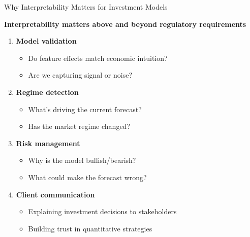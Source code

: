 \documentclass[10pt]{beamer}
\newcommand{\highlight}[1]{\textcolor{AccentOrange}{\textbf{#1}}}
\begin{document}
\begin{frame}{Why Interpretability Matters for Investment Models}

  \highlight{Interpretability matters above and beyond regulatory requirements}

  \vspace{0.5em}
  \begin{enumerate}
    \item \textbf{Model validation}
    \begin{itemize}
      \item Do feature effects match economic intuition?
      \item Are we capturing signal or noise?
    \end{itemize}

    \vspace{0.3em}
    \item \textbf{Regime detection}
    \begin{itemize}
      \item What's driving the current forecast?
      \item Has the market regime changed?
    \end{itemize}

    \vspace{0.3em}
    \item \textbf{Risk management}
    \begin{itemize}
      \item Why is the model bullish/bearish?
      \item What could make the forecast wrong?
    \end{itemize}

    \vspace{0.3em}
    \item \textbf{Client communication}
    \begin{itemize}
      \item Explaining investment decisions to stakeholders
      \item Building trust in quantitative strategies
    \end{itemize}
  \end{enumerate}
\end{frame}

\end{document}
